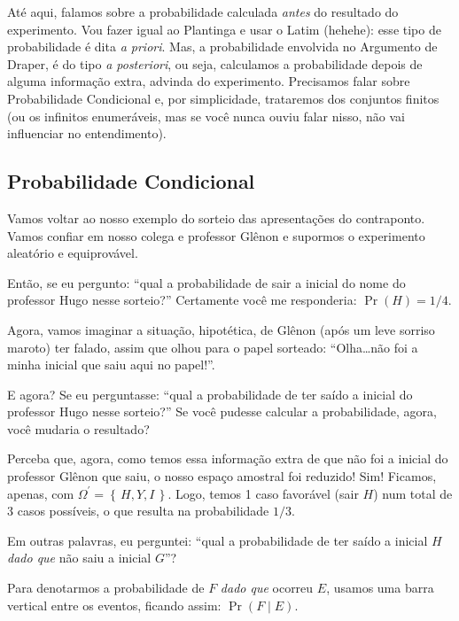 \documentclass[12pt]{article}
\theoremstyle{definition}
\begin{document}
Até aqui, falamos sobre a probabilidade calculada \textit{antes} do resultado
do experimento.
Vou fazer igual ao Plantinga e usar o Latim (hehehe): esse tipo de probabilidade
é dita \textit{a priori}.
Mas, a probabilidade envolvida no Argumento de Draper, é do tipo 
\textit{a posteriori}, ou seja, calculamos a probabilidade depois de alguma
informação extra, advinda do experimento.
Precisamos falar sobre Probabilidade Condicional e, por simplicidade, trataremos
dos conjuntos finitos (ou os infinitos enumeráveis, mas se você nunca ouviu
falar nisso, não vai influenciar no entendimento).
 \subsection{Probabilidade Condicional}
  Vamos voltar ao nosso exemplo do sorteio das apresentações do contraponto.
		Vamos confiar em nosso colega e professor Glênon e supormos o experimento
		aleatório e equiprovável.
		
		Então, se eu pergunto: ``qual a probabilidade de sair a inicial do nome do 
		professor Hugo nesse sorteio?''
		Certamente você me responderia: $ \Pr{(H)} = 1/4 $.
		
		Agora, vamos imaginar a situação, hipotética, de Glênon (após um leve sorriso
		maroto) ter falado, assim que olhou para o papel sorteado: ``Olha\ldots não
		foi a minha inicial que saiu aqui no papel!''.
		
		E agora?
		Se eu perguntasse: ``qual a probabilidade de ter saído a inicial do professor
		Hugo nesse sorteio?''
		Se você pudesse calcular a probabilidade, agora, você mudaria o resultado?
	
	 Perceba que, agora, como temos essa informação extra de que não foi a inicial
		do professor Glênon que saiu, o nosso espaço amostral foi reduzido!
		Sim!
		Ficamos, apenas, com $\Omega^\prime = \left\{\, H, Y, I\,\right\}$.
		Logo, temos 1 caso favorável (sair $H$) num total de 3 casos possíveis, o que
		resulta na probabilidade $1/3$.
		
		Em outras palavras, eu perguntei: ``qual a probabilidade de ter saído a 
		inicial $H$ \textit{dado que} não saiu a inicial $G$''?
		
		Para denotarmos a probabilidade de $F$ \textit{dado que} ocorreu $E$, usamos
		uma barra vertical entre os eventos, ficando assim: $ \Pr{(F \mid E)} $.
		
\end{document}
